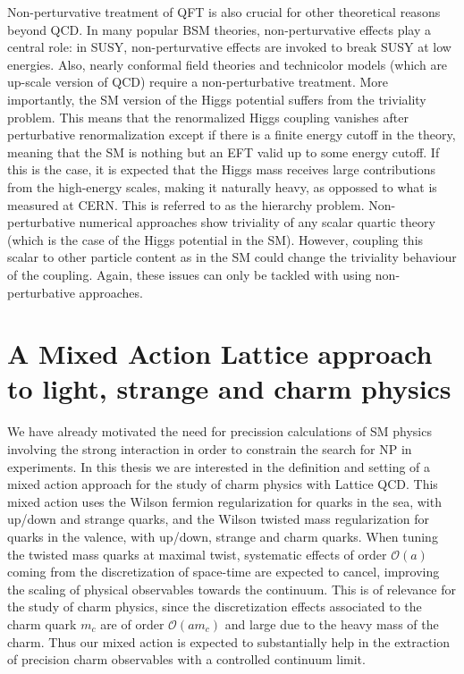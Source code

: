 Non-perturvative treatment of QFT is also crucial for other theoretical reasons beyond QCD. In many popular BSM theories, non-perturvative effects play a central role: in SUSY, non-perturvative effects are invoked to break SUSY at low energies. Also, nearly conformal field theories and technicolor models (which are up-scale version of QCD) require a non-perturbative treatment. More importantly, the SM version of the Higgs potential suffers from the triviality problem. This means that the renormalized Higgs coupling vanishes after perturbative renormalization except if there is a finite energy cutoff in the theory, meaning that the SM is nothing but an EFT valid up to some energy cutoff. If this is the case, it is expected that the Higgs mass receives large contributions from the high-energy scales, making it naturally heavy, as oppossed to what is measured at CERN. This is referred to as the hierarchy problem. Non-perturbative numerical approaches show triviality of any scalar quartic theory (which is the case of the Higgs potential in the SM). However, coupling this scalar to other particle content as in the SM could change the triviality behaviour of the coupling. Again, these issues can only be tackled with using non-perturbative approaches.

\section{A Mixed Action Lattice approach to light, strange and charm physics}

We have already motivated the need for precission calculations of SM physics involving the strong interaction in order to constrain the search for NP in experiments. In this thesis we are interested in the definition and setting of a mixed action approach for the study of charm physics with Lattice QCD. This mixed action uses the Wilson fermion regularization for quarks in the sea, with up/down and strange quarks, and the Wilson twisted mass regularization for quarks in the valence, with up/down, strange and charm quarks. When tuning the twisted mass quarks at maximal twist, systematic effects of order $\mathcal{O}(a)$ coming from the discretization of space-time are expected to cancel, improving the scaling of physical observables towards the continuum. This is of relevance for the study of charm physics, since the discretization effects associated to the charm quark $m_c$ are of order $\mathcal{O}(am_c)$ and large due to the heavy mass of the charm. Thus our mixed action is expected to substantially help in the extraction of precision charm observables with a controlled continuum limit.

